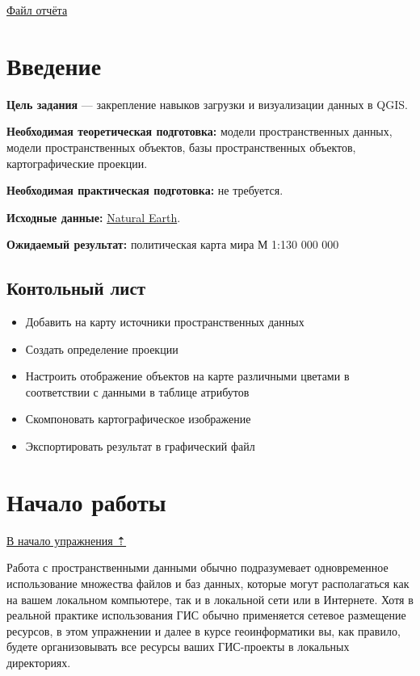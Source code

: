 \documentclass[
  12pt,
]{book}
\providecommand{\tightlist}{%
  \setlength{\itemsep}{0pt}\setlength{\parskip}{0pt}}
\begin{document}
\href{}{Файл отчёта}

\hypertarget{map-design-world-intro}{%
\section{Введение}\label{map-design-world-intro}}

\textbf{Цель задания} --- закрепление навыков загрузки и визуализации данных в QGIS.

\textbf{Необходимая теоретическая подготовка:} модели пространственных данных, модели пространственных объектов, базы пространственных объектов, картографические проекции.

\textbf{Необходимая практическая подготовка:} не требуется.

\textbf{Исходные данные:} \href{https://www.naturalearthdata.com/}{Natural Earth}.

\textbf{Ожидаемый результат:} политическая карта мира М 1:130 000 000

\hypertarget{map-design-world-checklist}{%
\subsection{Контольный лист}\label{map-design-world-checklist}}

\begin{itemize}
\tightlist
\item
  Добавить на карту источники пространственных данных
\item
  Создать определение проекции
\item
  Настроить отображение объектов на карте различными цветами в соответствии с данными в таблице атрибутов
\item
  Скомпоновать картографическое изображение
\item
  Экспортировать результат в графический файл
\end{itemize}

\hypertarget{map-design-world-begin}{%
\section{Начало работы}\label{map-design-world-begin}}

\protect\hyperlink{map-design-world}{В начало упражнения ⇡}

Работа с пространственными данными обычно подразумевает одновременное использование множества файлов и баз данных, которые могут располагаться как на вашем локальном компьютере, так и в локальной сети или в Интернете. Хотя в реальной практике использования ГИС обычно применяется сетевое размещение ресурсов, в этом упражнении и далее в курсе геоинформатики вы, как правило, будете организовывать все ресурсы ваших ГИС-проекты в локальных директориях.
\end{document}
